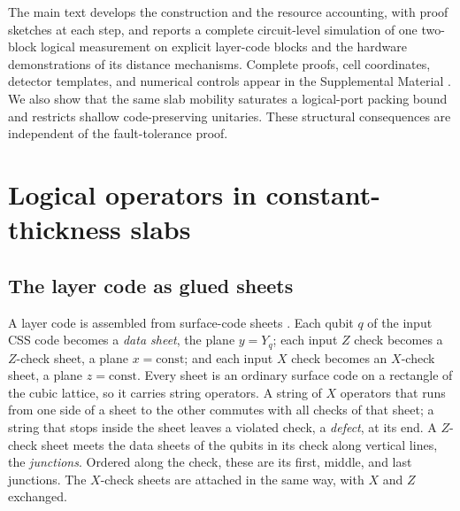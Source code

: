 The main text develops the construction and the resource accounting, with
proof sketches at each step, and reports a complete circuit-level simulation
of one two-block logical measurement on explicit layer-code blocks and the
hardware demonstrations of its distance mechanisms. Complete proofs, cell coordinates, detector
templates, and numerical controls appear in the Supplemental Material
\cite{Supplemental}. We also show that the same slab mobility saturates a
logical-port packing bound and restricts shallow code-preserving unitaries.
These structural consequences are independent of the fault-tolerance proof.

\section{Logical operators in constant-thickness slabs}
\label{sec:slabs}
\subsection{The layer code as glued sheets}
A layer code is assembled from surface-code sheets
\cite{WilliamsonBaspinLayerCodes}.  Each qubit $q$ of the input CSS code
becomes a \emph{data sheet}, the plane $y=Y_q$; each input $Z$ check becomes
a $Z$-check sheet, a plane $x=\mathrm{const}$; and each input $X$ check
becomes an $X$-check sheet, a plane $z=\mathrm{const}$.  Every sheet is an
ordinary surface code on a rectangle of the cubic lattice, so it carries
string operators.  A string of $X$ operators that runs from one side of a
sheet to the other commutes with all checks of that sheet; a string that
stops inside the sheet leaves a violated check, a \emph{defect}, at its end.
A $Z$-check sheet meets the data sheets of the qubits in its check along
vertical lines, the \emph{junctions}.  Ordered along the check, these are its
first, middle, and last junctions.  The $X$-check sheets are attached in the
same way, with $X$ and $Z$ exchanged.

